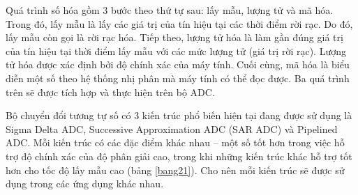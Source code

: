 Quá trình số hóa gồm 3 bước theo thứ tự sau: lấy mẫu, lượng tử và mã hóa. Trong đó, lấy mẫu là lấy các giá trị của tín hiệu tại các thời điểm rời rạc. Do đó, lấy mẫu còn gọi là rời rạc hóa. Tiếp theo, lượng tử hóa là làm gần đúng giá trị của tín hiệu tại thời điểm lấy mẫu với các mức lượng tử (giá trị rời rạc). Lượng tử hóa được xác định bởi độ chính xác của máy tính. Cuối cùng, mã hóa là biểu diễn một số theo hệ thống nhị phân mà máy tính có thể đọc được\cite{xulytinhieusobook}. Ba quá trình trên sẽ được tích hợp và thực hiện trên bộ ADC.

Bộ chuyển đổi tương tự số có 3 kiến trúc phổ biến hiện tại đang được sử dụng là 
Sigma Delta ADC, Successive Approximation ADC (SAR ADC) và Pipelined ADC.
Mỗi kiến trúc có các đặc điểm khác nhau – một số tốt hơn trong việc hỗ trợ độ chính xác của độ phân giải cao, trong khi những kiến trúc khác hỗ trợ tốt hơn cho tốc độ lấy mẫu cao (bảng \ref{bang21}). Cho nên mỗi kiến trúc sẽ được sử dụng trong các ứng dụng khác nhau.
